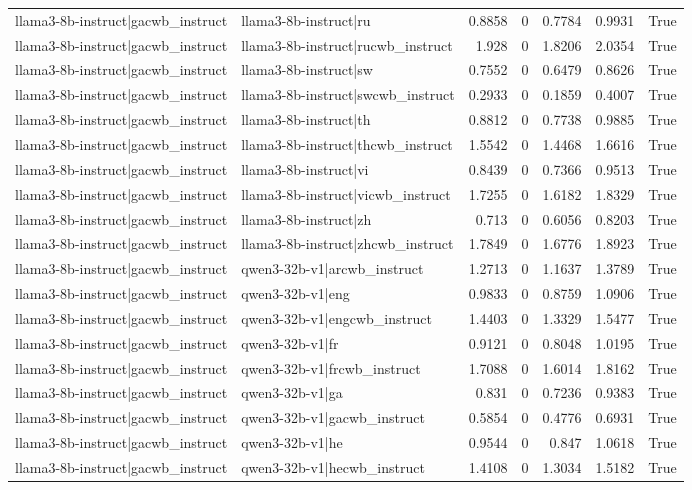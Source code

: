 \begin{table}
\begin{tabular}{l l r r r r l}
llama3-8b-instruct|gacwb_instruct & llama3-8b-instruct|ru & 0.8858 & 0 & 0.7784 & 0.9931 & True \\
llama3-8b-instruct|gacwb_instruct & llama3-8b-instruct|rucwb_instruct & 1.928 & 0 & 1.8206 & 2.0354 & True \\
llama3-8b-instruct|gacwb_instruct & llama3-8b-instruct|sw & 0.7552 & 0 & 0.6479 & 0.8626 & True \\
llama3-8b-instruct|gacwb_instruct & llama3-8b-instruct|swcwb_instruct & 0.2933 & 0 & 0.1859 & 0.4007 & True \\
llama3-8b-instruct|gacwb_instruct & llama3-8b-instruct|th & 0.8812 & 0 & 0.7738 & 0.9885 & True \\
llama3-8b-instruct|gacwb_instruct & llama3-8b-instruct|thcwb_instruct & 1.5542 & 0 & 1.4468 & 1.6616 & True \\
llama3-8b-instruct|gacwb_instruct & llama3-8b-instruct|vi & 0.8439 & 0 & 0.7366 & 0.9513 & True \\
llama3-8b-instruct|gacwb_instruct & llama3-8b-instruct|vicwb_instruct & 1.7255 & 0 & 1.6182 & 1.8329 & True \\
llama3-8b-instruct|gacwb_instruct & llama3-8b-instruct|zh & 0.713 & 0 & 0.6056 & 0.8203 & True \\
llama3-8b-instruct|gacwb_instruct & llama3-8b-instruct|zhcwb_instruct & 1.7849 & 0 & 1.6776 & 1.8923 & True \\
llama3-8b-instruct|gacwb_instruct & qwen3-32b-v1|arcwb_instruct & 1.2713 & 0 & 1.1637 & 1.3789 & True \\
llama3-8b-instruct|gacwb_instruct & qwen3-32b-v1|eng & 0.9833 & 0 & 0.8759 & 1.0906 & True \\
llama3-8b-instruct|gacwb_instruct & qwen3-32b-v1|engcwb_instruct & 1.4403 & 0 & 1.3329 & 1.5477 & True \\
llama3-8b-instruct|gacwb_instruct & qwen3-32b-v1|fr & 0.9121 & 0 & 0.8048 & 1.0195 & True \\
llama3-8b-instruct|gacwb_instruct & qwen3-32b-v1|frcwb_instruct & 1.7088 & 0 & 1.6014 & 1.8162 & True \\
llama3-8b-instruct|gacwb_instruct & qwen3-32b-v1|ga & 0.831 & 0 & 0.7236 & 0.9383 & True \\
llama3-8b-instruct|gacwb_instruct & qwen3-32b-v1|gacwb_instruct & 0.5854 & 0 & 0.4776 & 0.6931 & True \\
llama3-8b-instruct|gacwb_instruct & qwen3-32b-v1|he & 0.9544 & 0 & 0.847 & 1.0618 & True \\
llama3-8b-instruct|gacwb_instruct & qwen3-32b-v1|hecwb_instruct & 1.4108 & 0 & 1.3034 & 1.5182 & True \\

\end{tabular}
\end{table}
